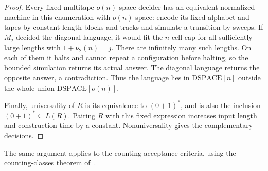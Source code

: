 \documentclass[11pt]{article}
\theoremstyle{definition}
\theoremstyle{remark}
\begin{document}
\begin{proof}
Every fixed multitape $o(n)$-space decider has an equivalent normalized
machine in this enumeration with $o(n)$ space: encode its fixed
alphabet and tapes by constant-length blocks and tracks and simulate
a transition by sweeps. If $M_j$ decided the diagonal language, it
would fit the $n$-cell cap for all sufficiently large lengths with
$1+\nu_2(n)=j$. There are infinitely many such lengths. On each of
them it halts and cannot repeat a configuration before halting, so
the bounded simulation returns its actual answer. The diagonal
language returns the opposite answer, a contradiction. Thus the
language lies in $\mathrm{DSPACE}[n]$ outside the whole union
$\mathrm{DSPACE}[o(n)]$.

Finally, universality of $R$ is its equivalence to $(0+1)^*$, and is
also the inclusion $(0+1)^*\subseteq L(R)$. Pairing $R$ with this
fixed expression increases input length and construction time by a
constant. Nonuniversality gives the complementary decisions.
\end{proof}

The same argument applies to the counting acceptance criteria, using
the counting-classes theorem of~\cite{Cruz26}.
\end{document}
